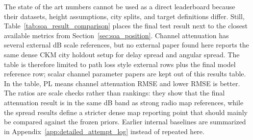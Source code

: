 The state of the art numbers cannot be used as a direct leaderboard because
their datasets, height assumptions, city splits, and target definitions differ.
Still, Table~\ref{tab:soa_result_comparison} places the final test result next
to the closest available metrics from Section~\ref{sec:soa_position}. Channel
attenuation has several external dB scale references, but no external paper
found here reports the same dense CKM city holdout setup for delay spread
and angular spread. The table is therefore limited to path loss style external
rows plus the final model reference row; scalar channel parameter papers are
kept out of this results table. In the table, PL means channel attenuation RMSE
and lower RMSE is better. The ratios are scale checks rather than rankings:
they show that the final attenuation result is in the same dB band as strong
radio map references, while the spread results define a stricter dense map
reporting point that should mainly be compared against the frozen priors.
Earlier internal baselines are summarized in
Appendix~\ref{app:detailed_attempt_log} instead of repeated here.

